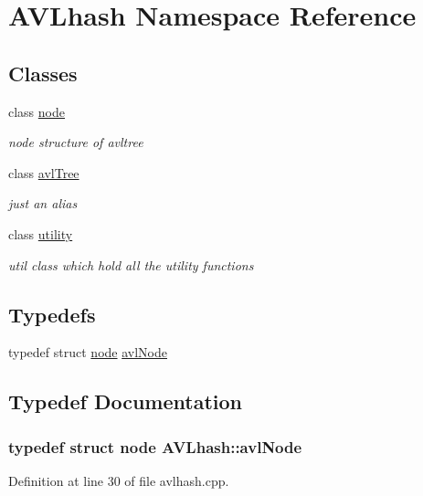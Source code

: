 \hypertarget{namespace_a_v_lhash}{\section{A\-V\-Lhash Namespace Reference}
\label{namespace_a_v_lhash}
}
\subsection*{Classes}
\begin{DoxyCompactItemize}
\item 
class \hyperlink{class_a_v_lhash_1_1node}{node}
\begin{DoxyCompactList}\small\item\em node structure of avltree \end{DoxyCompactList}\item 
class \hyperlink{class_a_v_lhash_1_1avl_tree}{avl\-Tree}
\begin{DoxyCompactList}\small\item\em just an alias \end{DoxyCompactList}\item 
class \hyperlink{class_a_v_lhash_1_1utility}{utility}
\begin{DoxyCompactList}\small\item\em util class which hold all the utility functions \end{DoxyCompactList}\end{DoxyCompactItemize}
\subsection*{Typedefs}
\begin{DoxyCompactItemize}
\item 
typedef struct \hyperlink{class_a_v_lhash_1_1node}{node} \hyperlink{namespace_a_v_lhash_a09cd9142193c004fe02c59c9dbc29732}{avl\-Node}
\end{DoxyCompactItemize}


\subsection{Typedef Documentation}
\hypertarget{namespace_a_v_lhash_a09cd9142193c004fe02c59c9dbc29732}{
\subsubsection[{avl\-Node}]{\setlength{\rightskip}{0pt plus 5cm}typedef struct {\bf node} {\bf A\-V\-Lhash\-::avl\-Node}}}\label{namespace_a_v_lhash_a09cd9142193c004fe02c59c9dbc29732}


Definition at line 30 of file avlhash.\-cpp.

